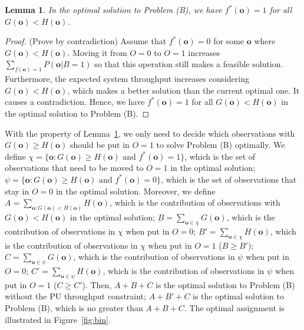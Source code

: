 \documentclass[conference]{IEEEtran}
\newtheorem{lemma}[theorem]{Lemma}
\begin{document}
\begin{lemma}
\label{lem:Bayesian}
In the optimal solution to Problem (B), we have $f^*(\boldsymbol{o})=1$ for all $G(\boldsymbol{o})<H(\boldsymbol{o})$.
\end{lemma}

\begin{proof}
(Prove by contradiction) Assume that $f^*(\boldsymbol{o})=0$ for some $\boldsymbol{o}$ where $G(\boldsymbol{o})<H(\boldsymbol{o})$. Moving it from $O=0$ to $O=1$ increases $\sum\limits_{f(\boldsymbol{o})=1}{P(\boldsymbol{o}|B=1)}$ so that this operation still makes a feasible solution. Furthermore, the expected system throughput increases considering $G(\boldsymbol{o})<H(\boldsymbol{o})$, which makes a better solution than the current optimal one. It causes a contradiction. Hence, we have $f^*(\boldsymbol{o})=1$ for all $G(\boldsymbol{o})<H(\boldsymbol{o})$ in the optimal solution to Problem (B).
\end{proof}

With the property of Lemma~\ref{lem:Bayesian}, we only need to decide which observations with $G(\boldsymbol{o})\ge H(\boldsymbol{o})$ should be put in $O=1$ to solve Problem (B) optimally. We define $\chi=\{\boldsymbol{o}:G(\boldsymbol{o})\ge H(\boldsymbol{o})\mbox{ and }f^*(\boldsymbol{o})=1\}$, which is the set of observations that need to be moved to $O=1$ in the optimal solution; $\psi=\{\boldsymbol{o}:G(\boldsymbol{o})\ge H(\boldsymbol{o})\mbox{ and }f^*(\boldsymbol{o})=0\}$, which is the set of observations that stay in $O=0$ in the optimal solution. Moreover, we define $A=\sum\limits_{\boldsymbol{o}:G(\boldsymbol{o})<H(\boldsymbol{o})}{H(\boldsymbol{o})}$, which is the contribution of observations with $G(\boldsymbol{o})<H(\boldsymbol{o})$ in the optimal solution; $B=\sum\limits_{\boldsymbol{o}\in \chi}{G(\boldsymbol{o})}$, which is the contribution of observations in $\chi$ when put in $O=0$; $B'=\sum\limits_{\boldsymbol{o}\in \chi}{H(\boldsymbol{o})}$, which is the contribution of observations in $\chi$ when put in $O=1$ ($B\ge B'$); $C=\sum\limits_{\boldsymbol{o}\in \psi}{G(\boldsymbol{o})}$, which is the contribution of observations in $\psi$ when put in $O=0$; $C'=\sum\limits_{\boldsymbol{o}\in \psi}{H(\boldsymbol{o})}$, which is the contribution of observations in $\psi$ when put in $O=1$ ($C \ge C'$). Then, $A+B+C$ is the optimal solution to Problem (B) without the PU throughput constraint; $A+B'+C$ is the optimal solution to Problem (B), which is no greater than $A+B+C$. The optimal assignment is illustrated in Figure~\ref{fig:bin}. 
\end{document}

